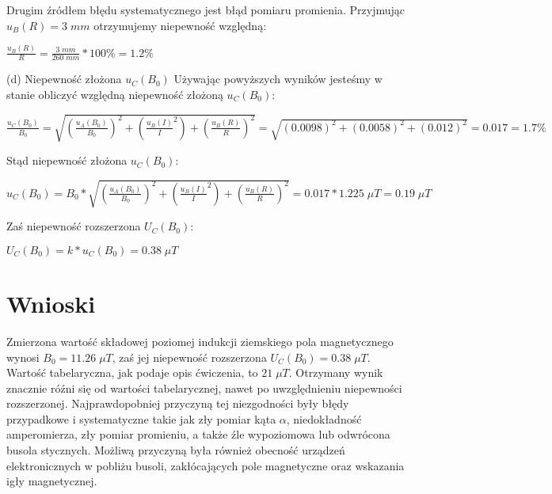 \documentclass[12pt]{article}
\begin{document}
Drugim źródłem błędu systematycznego jest błąd pomiaru promienia. Przyjmując $u_B(R)=3\;mm$ otrzymujemy niepewność względną:
\begin{center}
\Large $ \frac{u_B(R)}{R} = \frac{3\;mm}{260\;mm}*100\% =1.2\%$ 
\end{center}
(d) Niepewność złożona $u_C(B_0)$ \newline
Używając powyższych wyników jesteśmy w stanie obliczyć względną niepewność złożoną $u_C(B_0)$:
\begin{center}
\Large $ \frac{u_C(B_0)}{B_0}=\sqrt{(\frac{u_A(B_0)}{B_0})^2+(\frac{u_B(I)}{I}^2)+(\frac{u_B(R)}{R})^2} = \sqrt{(0.0098)^2+(0.0058)^2+(0.012)^2} = 0.017 = 1.7\%$
\end{center} 
Stąd niepewność złożona $u_C(B_0)$:
\begin{center}
\Large $ u_C(B_0) = B_0*\sqrt{(\frac{u_A(B_0)}{B_0})^2+(\frac{u_B(I)}{I}^2)+(\frac{u_B(R)}{R})^2} = 0.017*1.225\;\mu{T} = 0.19\;\mu{T}$ 
\end{center}
Zaś niepewność rozszerzona $U_C(B_0)$:
\begin{center}
\Large $ U_C(B_0) = k*u_C(B_0) = 0.38\;\mu{T}$ 
\end{center}
\section{Wnioski}
Zmierzona wartość składowej poziomej indukcji ziemskiego pola magnetycznego wynosi $B_0 = 11.26\;\mu{T}$, zaś jej niepewność rozszerzona $U_C(B_0) = 0.38\;\mu{T}$. Wartość tabelaryczna, jak podaje opis ćwiczenia, to $21\;\mu{T}$. Otrzymany wynik znacznie róźni się od wartości tabelarycznej, nawet po uwzględnieniu niepewności rozszerzonej. Najprawdopobniej przyczyną tej niezgodności były błędy przypadkowe i systematyczne takie jak zły pomiar kąta $\alpha$, niedokładność amperomierza, zły pomiar promieniu, a także źle wypoziomowa lub odwrócona busola stycznych. Możliwą przyczyną była również obecność urządzeń elektronicznych w pobliżu busoli, zakłócających pole magnetyczne oraz wskazania igły magnetycznej. 
\end{document}
